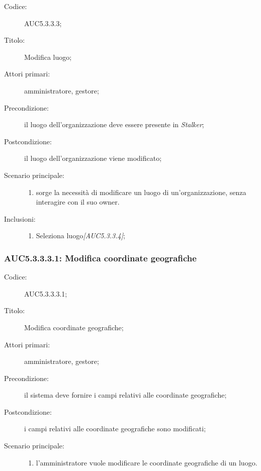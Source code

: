 \documentclass[../../../analisi-dei-requisiti.tex]{subfiles}
\begin{document}
\begin{description}
  \item[Codice:] AUC5.3.3.3;
  \item[Titolo:] Modifica luogo;
  \item[Attori primari:] amministratore, gestore;
  \item[Precondizione:] il luogo dell'organizzazione deve essere presente in \emph{Stalker};
  \item[Postcondizione:] il luogo dell'organizzazione viene modificato;
  \item[Scenario principale:]
  \begin{enumerate}
    \item sorge la necessità di modificare un luogo di un'organizzazione, senza interagire con il suo owner.
  \end{enumerate}
  \item[Inclusioni:]
  \begin{enumerate}
    \item Seleziona luogo\emph{[AUC5.3.3.4]};
  \end{enumerate}
\end{description}

\subsubsection{AUC5.3.3.3.1: Modifica coordinate geografiche}%
\label{subs:AUC5.3.3.3.1}
\begin{description}
  \item[Codice:] AUC5.3.3.3.1;
  \item[Titolo:] Modifica coordinate geografiche;
  \item[Attori primari:] amministratore, gestore;
  \item[Precondizione:] il sistema deve fornire i campi relativi alle coordinate geografiche;
  \item[Postcondizione:] i campi relativi alle coordinate geografiche sono modificati;
  \item[Scenario principale:]
  \begin{enumerate}
    \item l'amministratore vuole modificare le coordinate geografiche di un luogo.
  \end{enumerate}
\end{description}
\end{document}
